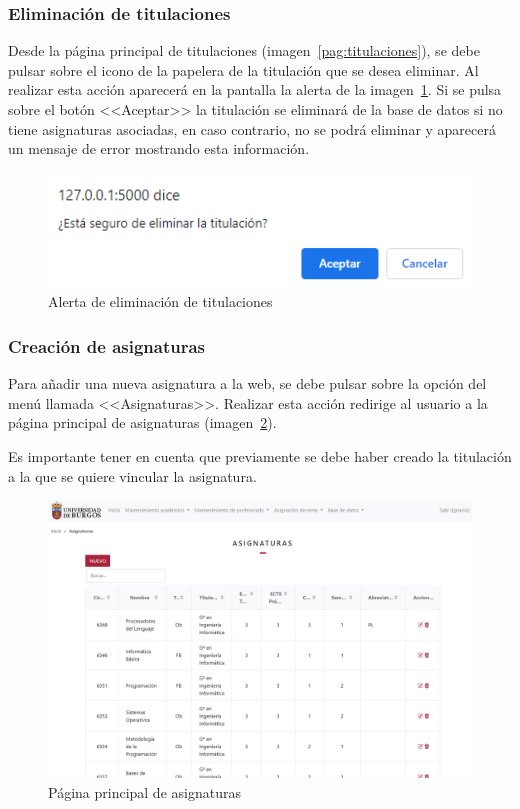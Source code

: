 \subsubsection{Eliminación de titulaciones}
Desde la página principal de titulaciones (imagen~\ref{pag:titulaciones}), se debe pulsar sobre el icono de la papelera de la titulación que se desea eliminar.
Al realizar esta acción aparecerá en la pantalla la alerta de la imagen~\ref{pag:alertElTitulacion}. Si se pulsa sobre el botón <<Aceptar>> la titulación se eliminará de la base de datos si no tiene asignaturas asociadas, en caso contrario, no se podrá eliminar y aparecerá un mensaje de error mostrando esta información.

\begin{figure}
	\centering
	\includegraphics[width=\textwidth]{../img/Anexos/Manual usuario/alertElTitulacion.png}
	\caption{Alerta de eliminación de titulaciones}\label{pag:alertElTitulacion}
\end{figure}

\subsubsection{Creación de asignaturas}
Para añadir una nueva asignatura a la web, se debe pulsar sobre la opción del menú llamada <<Asignaturas>>.
Realizar esta acción redirige al usuario a la página principal de asignaturas (imagen~\ref{pag:asignaturas}).

Es importante tener en cuenta que previamente se debe haber creado la titulación a la que se quiere vincular la asignatura.

\begin{figure}
	\centering
	\includegraphics[width=\textwidth]{../img/Anexos/Manual usuario/asignaturas.png}
	\caption{Página principal de asignaturas}\label{pag:asignaturas}
\end{figure}

